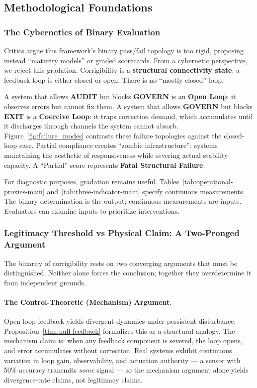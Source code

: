 \documentclass{article}
\begin{document}
\subsection{Methodological Foundations}
\label{subsec:methodology}

\subsubsection{The Cybernetics of Binary Evaluation}

Critics argue this framework's binary pass/fail topology is too rigid, proposing instead ``maturity models'' or graded scorecards. From a cybernetic perspective, we reject this gradation. Corrigibility is a \textbf{structural connectivity state}: a feedback loop is either closed or open. There is no ``mostly closed'' loop.

A system that allows \textbf{AUDIT} but blocks \textbf{GOVERN} is an \textbf{Open Loop}: it observes errors but cannot fix them. A system that allows \textbf{GOVERN} but blocks \textbf{EXIT} is a \textbf{Coercive Loop}: it traps correction demand, which accumulates until it discharges through channels the system cannot absorb. Figure~\ref{fig:failure_modes} contrasts these failure topologies against the closed-loop case. Partial compliance creates ``zombie infrastructure'': systems maintaining the aesthetic of responsiveness while severing actual stability capacity. A ``Partial'' score represents \textbf{Fatal Structural Failure}.

For diagnostic purposes, gradation remains useful. Tables~\ref{tab:operational-proxies-main} and~\ref{tab:three-indicator-main} specify continuous measurements. The binary determination is the output; continuous measurements are inputs. Evaluators can examine inputs to prioritize interventions.

\subsubsection{Legitimacy Threshold vs Physical Claim: A Two-Pronged Argument}
\label{subsubsec:two-pronged}

The binarity of corrigibility rests on two converging arguments that must be distinguished. Neither alone forces the conclusion; together they overdetermine it from independent grounds.

\paragraph{The Control-Theoretic (Mechanism) Argument.} Open-loop feedback yields divergent dynamics under persistent disturbance. Proposition~\ref{thm:null-feedback} formalizes this as a structural analogy. The mechanism claim is: when any feedback component is severed, the loop opens, and error accumulates without correction. Real systems exhibit continuous variation in loop gain, observability, and actuation authority --- a sensor with 50\% accuracy transmits \textit{some} signal --- so the mechanism argument alone yields divergence-rate claims, not legitimacy claims.
\end{document}
